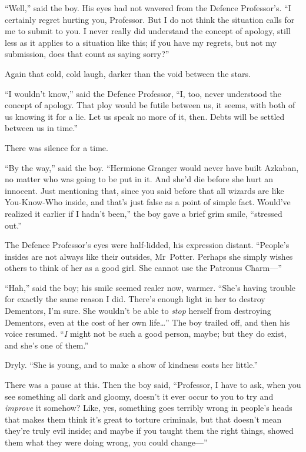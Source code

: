“Well,” said the boy. His eyes had not wavered from the Defence Professor’s.
“I certainly regret hurting you, Professor. But I do not think the situation calls for me to submit to you. I never really did understand the concept of apology, still less as it applies to a situation like this; if you have my regrets, but not my submission, does that count as saying sorry?”

Again that cold, cold laugh, darker than the void between the stars.

“I wouldn’t know,” said the Defence Professor,
“I, too, never understood the concept of apology. That ploy would be futile between us, it seems, with both of us knowing it for a lie. Let us speak no more of it, then. Debts will be settled between us in time.”

There was silence for a time.

“By the way,” said the boy.
“Hermione Granger would never have built Azkaban, no matter who was going to be put in it. And she’d die before she hurt an innocent. Just mentioning that, since you said before that all wizards are like You-Know-Who inside, and that’s just false as a point of simple fact. Would’ve realized it earlier if I hadn’t been,” the boy gave a brief grim smile, “stressed out.”

The Defence Professor’s eyes were half-lidded, his expression distant.
“People’s insides are not always like their outsides, Mr~Potter. Perhaps she simply wishes others to think of her as a good girl. She cannot use the Patronus Charm—”

“Hah,” said the boy; his smile seemed realer now, warmer.
“She’s having trouble for exactly the same reason I did. There’s enough light in her to destroy Dementors, I’m sure. She wouldn’t be able to \emph{stop} herself from destroying Dementors, even at the cost of her own life…” The boy trailed off, and then his voice resumed. “\emph{I} might not be such a good person, maybe; but they do exist, and she’s one of them.”

Dryly.
“She is young, and to make a show of kindness costs her little.”

There was a pause at this. Then the boy said,
“Professor, I have to ask, when you see something all dark and gloomy, doesn’t it ever occur to you to try and \emph{improve} it somehow? Like, yes, something goes terribly wrong in people’s heads that makes them think it’s great to torture criminals, but that doesn’t mean they’re truly evil inside; and maybe if you taught them the right things, showed them what they were doing wrong, you could change—”

